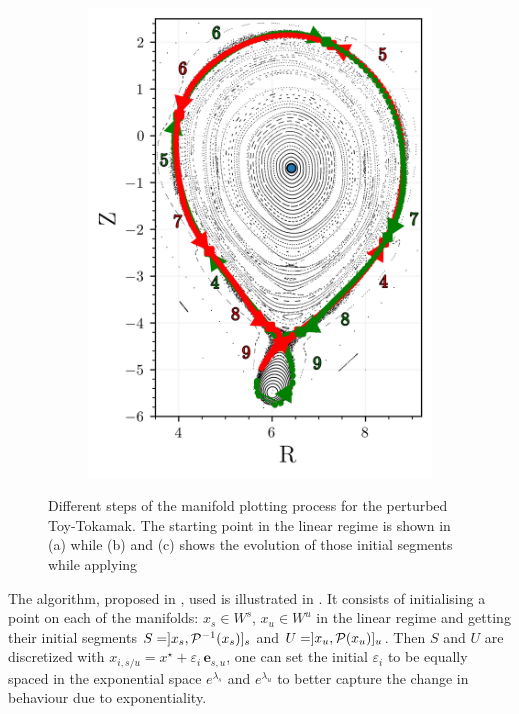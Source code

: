 \begin{figure}[H]
\begin{minipage}{0.5\textwidth}
\begin{subfigure}[b]{\textwidth}
            \includegraphics[width=\textwidth]{images/manifold/manifold.png}
            \caption{}
            \label{fig:man-c}
        \end{subfigure}
    \end{minipage}
    \caption{Different steps of the manifold plotting process for the perturbed Toy-Tokamak. The starting point in the linear regime is shown in (a) while (b) and (c) shows the evolution of those initial segments while applying  }
    \label{fig:manifold-algo}
\end{figure}

The algorithm, proposed in \cite{wei_invariant_2023}, used is illustrated in . It consists of initialising a point on each of the manifolds: $x_s \in W^s$, $x_u \in W^u$ in the linear regime and getting their initial segments $S = ]x_s,\mathcal{P}^{-1}(x_s)]_s$ and $U = ]x_u,\mathcal{P}(x_u)]_u$. Then $S$ and $U$ are discretized with $x_{i,s/u} = x^\star + \varepsilon_i\,\textbf{e}_{s,u}$, one can set the initial $\varepsilon_i$ to be equally spaced in the exponential space $e^{\lambda_s}$ and $e^{\lambda_u}$ to better capture the change in behaviour due to exponentiality. 

